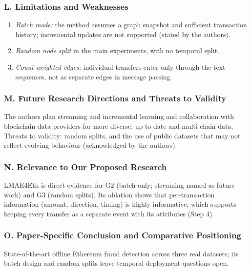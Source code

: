 \documentclass[11pt,a4paper]{article}
\begin{document}
\subsubsection*{L. Limitations and Weaknesses}
\begin{enumerate}[leftmargin=*]
    \item \textit{Batch mode:} the method assumes a graph snapshot and sufficient transaction history; incremental updates are not supported (stated by the authors).
    \item \textit{Random node split} in the main experiments, with no temporal split.
    \item \textit{Count-weighted edges:} individual transfers enter only through the text sequences, not as separate edges in message passing.
\end{enumerate}

\subsubsection*{M. Future Research Directions and Threats to Validity}
The authors plan streaming and incremental learning and collaboration with blockchain data providers for more diverse, up-to-date and multi-chain data. Threats to validity: random splits, and the use of public datasets that may not reflect evolving behaviour (acknowledged by the authors).

\subsubsection*{N. Relevance to Our Proposed Research}
LMAE4Eth is direct evidence for G2 (batch-only; streaming named as future work) and G3 (random splits). Its ablation shows that per-transaction information (amount, direction, timing) is highly informative, which supports keeping every transfer as a separate event with its attributes (Step 4).

\subsubsection*{O. Paper-Specific Conclusion and Comparative Positioning}
State-of-the-art offline Ethereum fraud detection across three real datasets; its batch design and random splits leave temporal deployment questions open.

\end{document}
